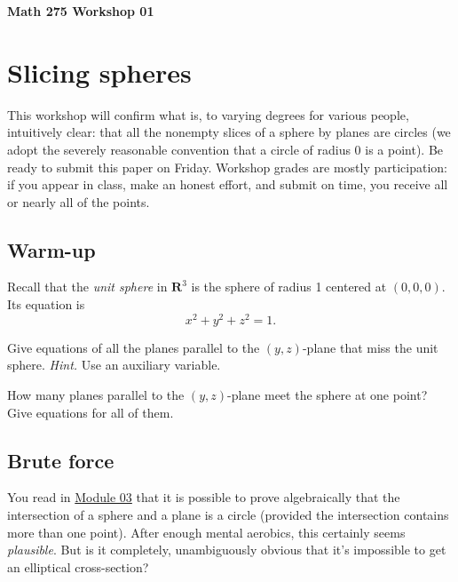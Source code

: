 \documentclass[12pt]{exam}
\begin{document}
\noindent
\textbf{{\large Math 275 \hfill Workshop 01}}

\noindent
{} 

\noindent
{} 

\noindent

\section{Slicing spheres}

This workshop will confirm what is, to varying degrees for various
people, intuitively clear: that all the nonempty slices of a sphere by
planes are circles (we adopt the severely reasonable convention that a
circle of radius 0 is a point). Be ready to submit this paper on Friday.
Workshop grades are mostly participation: if you appear in class, make
an honest effort, and submit on time, you receive all or nearly all of
the points.

\subsection{Warm-up}

Recall that the \emph{unit sphere} in $\mathbf{R}^3$ is the sphere of
radius 1 centered at $(0,0,0)$. Its equation is
\[ x^2 + y^2 + z^2 = 1. \]

\begin{questions}

\question Give equations of all the planes parallel to the $(y,z)$-plane that miss the unit sphere. \emph{Hint.} Use an auxiliary variable.

\question How many planes parallel to the $(y,z)$-plane meet the sphere at one point? Give equations for all of them.
 
\end{questions}

\subsection{Brute force}

You read in \href{../../Modules/03/Module.html}{Module 03} that it is
possible to prove algebraically that the intersection of a sphere and a
plane is a circle (provided the intersection contains more than one
point). After enough mental aerobics, this certainly seems
\emph{plausible}. But is it completely, unambiguously obvious that it's
impossible to get an elliptical cross-section?
\end{document}

